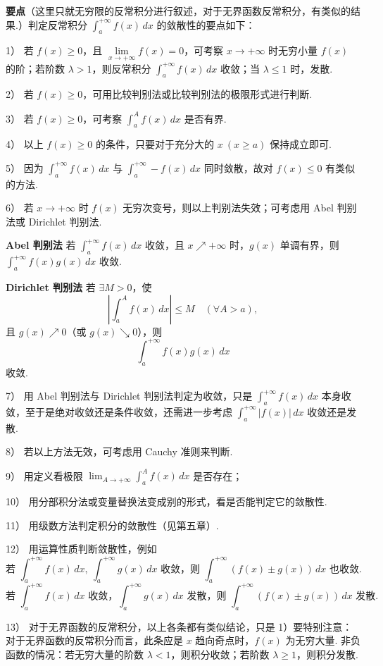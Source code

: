 \documentclass[UTF8,12pt,a4paper,fontset=fandol]{ctexart}
\begin{document}
\noindent\textbf{要点}\quad （这里只就无穷限的反常积分进行叙述，对于无界函数反常积分，有类似的结果.）判定反常积分 $\displaystyle\int_a^{+\infty}f(x)\,dx$ 的敛散性的要点如下：

1） 若 $f(x)\ge0$，且 $\lim\limits_{x\to+\infty}f(x)=0$，可考察 $x\to+\infty$ 时无穷小量 $f(x)$ 的阶；若阶数 $\lambda>1$，则反常积分 $\displaystyle\int_a^{+\infty}f(x)\,dx$ 收敛；当 $\lambda\le1$ 时，发散.

2） 若 $f(x)\ge0$，可用比较判别法或比较判别法的极限形式进行判断.

3） 若 $f(x)\ge0$，可考察 $\displaystyle\int_a^A f(x)\,dx$ 是否有界.

4） 以上 $f(x)\ge0$ 的条件，只要对于充分大的 $x\ (x\ge a)$ 保持成立即可.

5） 因为 $\displaystyle\int_a^{+\infty} f(x)\,dx$ 与 $\displaystyle\int_a^{+\infty}-f(x)\,dx$ 同时敛散，故对 $f(x)\le0$ 有类似的方法.

6） 若 $x\to+\infty$ 时 $f(x)$ 无穷次变号，则以上判别法失效；可考虑用 Abel 判别法或 Dirichlet 判别法.

\noindent\textbf{Abel 判别法}\quad
若 $\displaystyle\int_a^{+\infty}f(x)\,dx$ 收敛，且 $x\nearrow+\infty$ 时，$g(x)$ 单调有界，则 $\displaystyle\int_a^{+\infty}f(x)g(x)\,dx$ 收敛.

\noindent\textbf{Dirichlet 判别法}\quad
若 $\exists M>0$，使
\[
\left|\int_a^A f(x)\,dx\right|\le M\quad(\forall A>a),
\]
且 $g(x)\nearrow0$（或 $g(x)\searrow0$），则
\[
\int_a^{+\infty}f(x)g(x)\,dx
\]
收敛.

7） 用 Abel 判别法与 Dirichlet 判别法判定为收敛，只是 $\displaystyle\int_a^{+\infty}f(x)\,dx$ 本身收敛，至于是绝对收敛还是条件收敛，还需进一步考虑 $\displaystyle\int_a^{+\infty}|f(x)|\,dx$ 收敛还是发散.

8） 若以上方法无效，可考虑用 Cauchy 准则来判断.

9） 用定义看极限 $\displaystyle\lim_{A\to+\infty}\int_a^A f(x)\,dx$ 是否存在；

10） 用分部积分法或变量替换法变成别的形式，看是否能判定它的敛散性.

11） 用级数方法判定积分的敛散性（见第五章）.

12） 用运算性质判断敛散性，例如
\[
\text{若 }\int_a^{+\infty}f(x)\,dx,\ \int_a^{+\infty}g(x)\,dx\text{ 收敛，则 }
\int_a^{+\infty}(f(x)\pm g(x))\,dx\text{ 也收敛.}
\]
\[
\text{若 }\int_a^{+\infty}f(x)\,dx\text{ 收敛，}\int_a^{+\infty}g(x)\,dx\text{ 发散，则 }
\int_a^{+\infty}(f(x)\pm g(x))\,dx\text{ 发散.}
\]

13） 对于无界函数的反常积分，以上各条都有类似结论，只是 1）要特别注意：对于无界函数的反常积分而言，此条应是 $x$ 趋向奇点时，$f(x)$ 为无穷大量. 非负函数的情况：若无穷大量的阶数 $\lambda<1$，则积分收敛；若阶数 $\lambda\ge1$，则积分发散.
\end{document}

